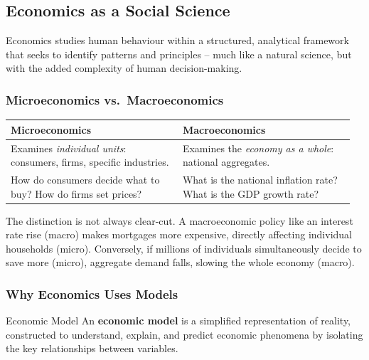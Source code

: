 \documentclass[11pt, a4paper, twoside]{book}
\begin{document}
\subsection{Economics as a Social Science}

\begin{coreidea}
Economics studies human behaviour within a structured, analytical framework that seeks to identify patterns and principles -- much like a natural science, but with the added complexity of human decision-making.
\end{coreidea}

\subsubsection{Microeconomics vs.\ Macroeconomics}

\begin{tcolorbox}[
  enhanced, colback=LightBlue, colframe=NavyPrimary,
  arc=0pt, boxrule=0.7pt
]
\begin{tabular}{@{}>{\RaggedRight\arraybackslash}p{0.48\linewidth}>{\RaggedRight\arraybackslash}p{0.48\linewidth}@{}}
\textbf{\color{NavyPrimary}\large Microeconomics} & \textbf{\color{NavyPrimary}\large Macroeconomics}\\
\midrule
Examines \emph{individual units}: consumers, firms, specific industries. & Examines the \emph{economy as a whole}: national aggregates.\\
How do consumers decide what to buy? How do firms set prices? & What is the national inflation rate? What is the GDP growth rate?\\
\end{tabular}
\end{tcolorbox}

The distinction is not always clear-cut. A macroeconomic policy like an interest rate rise (macro) makes mortgages more expensive, directly affecting individual households (micro). Conversely, if millions of individuals simultaneously decide to save more (micro), aggregate demand falls, slowing the whole economy (macro).

\subsubsection{Why Economics Uses Models}

\begin{keyterm}{Economic Model}
An \textbf{economic model} is a simplified representation of reality, constructed to understand, explain, and predict economic phenomena by isolating the key relationships between variables.
\end{keyterm}
\end{document}

